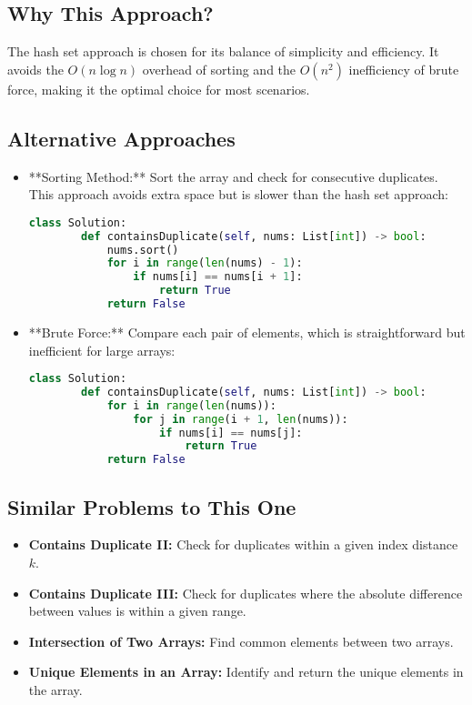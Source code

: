 \subsection*{Why This Approach?}
The hash set approach is chosen for its balance of simplicity and efficiency. It avoids the \(O(n \log n)\) overhead of sorting and the \(O(n^2)\) inefficiency of brute force, making it the optimal choice for most scenarios.

\subsection*{Alternative Approaches}
\begin{itemize}
    \item **Sorting Method:**  
    Sort the array and check for consecutive duplicates. This approach avoids extra space but is slower than the hash set approach:
    \begin{lstlisting}[language=Python]
    class Solution:
        def containsDuplicate(self, nums: List[int]) -> bool:
            nums.sort()
            for i in range(len(nums) - 1):
                if nums[i] == nums[i + 1]:
                    return True
            return False
    \end{lstlisting}

    \item **Brute Force:**  
    Compare each pair of elements, which is straightforward but inefficient for large arrays:
    \begin{lstlisting}[language=Python]
    class Solution:
        def containsDuplicate(self, nums: List[int]) -> bool:
            for i in range(len(nums)):
                for j in range(i + 1, len(nums)):
                    if nums[i] == nums[j]:
                        return True
            return False
    \end{lstlisting}
\end{itemize}

\subsection*{Similar Problems to This One}
\begin{itemize}
    \item \textbf{Contains Duplicate II:} Check for duplicates within a given index distance \(k\).
    \item \textbf{Contains Duplicate III:} Check for duplicates where the absolute difference between values is within a given range.
    \item \textbf{Intersection of Two Arrays:} Find common elements between two arrays.
    \item \textbf{Unique Elements in an Array:} Identify and return the unique elements in the array.
\end{itemize}

